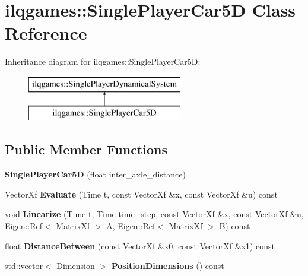 \hypertarget{classilqgames_1_1_single_player_car5_d}{}\section{ilqgames\+:\+:Single\+Player\+Car5D Class Reference}
\label{classilqgames_1_1_single_player_car5_d}
Inheritance diagram for ilqgames\+:\+:Single\+Player\+Car5D\+:\begin{figure}[H]
\begin{center}
\leavevmode
\includegraphics[height=2.000000cm]{classilqgames_1_1_single_player_car5_d}
\end{center}
\end{figure}
\subsection*{Public Member Functions}
\begin{DoxyCompactItemize}
\item 
{\bfseries Single\+Player\+Car5D} (float inter\+\_\+axle\+\_\+distance)\hypertarget{classilqgames_1_1_single_player_car5_d_aa2d4167f0643ec567c9b972027ef4097}{}\label{classilqgames_1_1_single_player_car5_d_aa2d4167f0643ec567c9b972027ef4097}

\item 
Vector\+Xf {\bfseries Evaluate} (Time t, const Vector\+Xf \&x, const Vector\+Xf \&u) const \hypertarget{classilqgames_1_1_single_player_car5_d_aec8946c18a72299e3b6fd01cb7eda35b}{}\label{classilqgames_1_1_single_player_car5_d_aec8946c18a72299e3b6fd01cb7eda35b}

\item 
void {\bfseries Linearize} (Time t, Time time\+\_\+step, const Vector\+Xf \&x, const Vector\+Xf \&u, Eigen\+::\+Ref$<$ Matrix\+Xf $>$ A, Eigen\+::\+Ref$<$ Matrix\+Xf $>$ B) const \hypertarget{classilqgames_1_1_single_player_car5_d_a9059f7965c8909944968d5445aee26b4}{}\label{classilqgames_1_1_single_player_car5_d_a9059f7965c8909944968d5445aee26b4}

\item 
float {\bfseries Distance\+Between} (const Vector\+Xf \&x0, const Vector\+Xf \&x1) const \hypertarget{classilqgames_1_1_single_player_car5_d_a1926a9e26bbca135158bf6e2f30c0fff}{}\label{classilqgames_1_1_single_player_car5_d_a1926a9e26bbca135158bf6e2f30c0fff}

\item 
std\+::vector$<$ Dimension $>$ {\bfseries Position\+Dimensions} () const \hypertarget{classilqgames_1_1_single_player_car5_d_aeb5fabf794950ec8e55e37d685c20027}{}\label{classilqgames_1_1_single_player_car5_d_aeb5fabf794950ec8e55e37d685c20027}

\end{DoxyCompactItemize}
